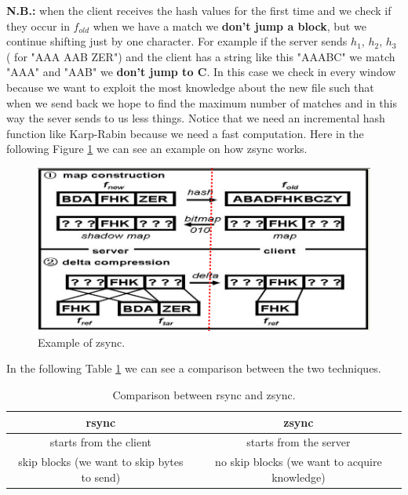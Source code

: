 \textbf{N.B.:} when the client receives the hash values for the first time and we check if they occur in $f_{old}$ when we have a match we \textbf{don't jump a block}, but we continue shifting just by one character. For example if the server sends $h_1$, $h_2$, $h_3$ ( for "AAA AAB ZER") and the client has a string like this "AAABC" we match "AAA" and "AAB" we \textbf{don't jump to C}. In this case we check in every window because we want to exploit the most knowledge about the new file such that when we send back we hope to find the maximum number of matches and in this way the sever sends to us less things.\newline
Notice that we need an incremental hash function like Karp-Rabin because we need a fast computation.\newline
Here in the following Figure \ref{fig:zsync} we can see an example on how zsync works.\newline
\begin{figure}
    \centering
    \includegraphics[width=0.75\linewidth]{images/zsync.PNG}
    \caption{Example of zsync.}
    \label{fig:zsync}
\end{figure}
In the following Table \ref{tab:comparison} we can see a comparison between the two techniques.\newline
\begin{table}[h!]
    \centering
    \begin{tabular}{|c|c|}
        \hline
         \textbf{rsync} & \textbf{zsync}  \\
         \hline
         starts from the client & starts from the server \\
         \hline
         skip blocks (we want to skip bytes to send) & no skip blocks (we want to acquire knowledge) \\
         \hline
    \end{tabular}
    \caption{Comparison between rsync and zsync.}
    \label{tab:comparison}
\end{table}
